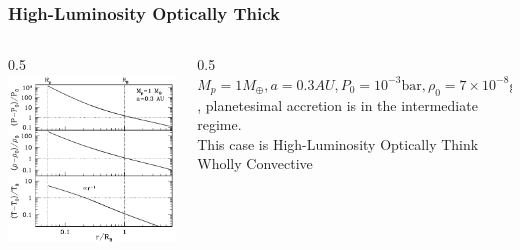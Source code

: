 \documentclass{beamer}
\begin{document}
\begin{frame}
\frametitle{High-Luminosity Optically Thick}
\begin{columns}[t] 
\begin{column}{0.5\textwidth} 
\vspace{-0.1cm}
\includegraphics[width=\textwidth]{High-Luminosity Optically Thick.png}
\end{column} 
\begin{column}{0.5\textwidth}
$M_p=1 M_{\oplus},a=0.3AU,P_0 = 10^{-3} \text{bar}, \rho_0 =7 \times 10^{-8} \text{g cm}^{-3},T_0= 550 \text{K}, \alpha=0, \beta=1, \gamma = \frac{7}{5}, \kappa_0=0.1 \text{cm}^2 \text{g}^{-1}$, planetesimal accretion is in the intermediate regime.\\
This case is High-Luminosity Optically Think Wholly Convective
\end{column} 
\end{columns}
\end{frame}
\end{document}
